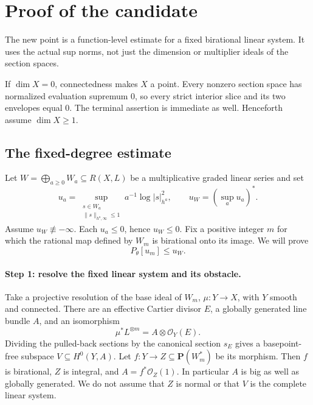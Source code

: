 \section{Proof of the candidate}
\label{sec:p147-candidate-proof}

The new point is a function-level estimate for a fixed birational linear
system.  It uses the actual sup norms, not just the dimension or
multiplier ideals of the section spaces.

If \(\dim X=0\), connectedness makes \(X\) a point.  Every nonzero
section space has normalized evaluation supremum \(0\), so every strict
interior slice and its two envelopes equal \(0\).  The terminal assertion
is immediate as well.  Henceforth assume \(\dim X\geq1\).

\subsection{The fixed-degree estimate}

Let \(W=\bigoplus_{a\geq0}W_a\subseteq R(X,L)\) be a multiplicative graded
linear series and set
\[
 u_a=\sup_{\substack{s\in W_a\\\|s\|_{h^a,\infty}\leq1}}
                   a^{-1}\log|s|_{h^a}^2,\qquad
 u_W=(\sup_a u_a)^*.
\]
Assume \(u_W\not\equiv-\infty\).  Each \(u_a\leq0\), hence \(u_W\leq0\).
Fix a positive integer \(m\) for which the rational map defined by \(W_m\)
is birational onto its image.  We will prove
\begin{equation}\label{eq:p147-fixed-degree-bound}
                         P_\theta[u_m]\leq u_W.
\end{equation}

\paragraph{Step 1: resolve the fixed linear system and its obstacle.}
Take a projective resolution of the base ideal of \(W_m\),
\(\mu:Y\to X\), with \(Y\) smooth and connected.  There are an effective
Cartier divisor \(E\), a globally generated line bundle \(A\), and an
isomorphism
\begin{equation}\label{eq:p147-resolved-bundle}
             \mu^*L^{\otimes m}=A\otimes\mathcal O_Y(E).
\end{equation}
Dividing the pulled-back sections by the canonical section \(s_E\)
gives a basepoint-free subspace \(V\subseteq H^0(Y,A)\).
Let \(f:Y\to Z\subseteq\mathbf P(W_m^*)\) be its morphism.
Then \(f\) is birational, \(Z\) is integral, and
\(A=f^*\mathcal O_Z(1)\).  In particular \(A\) is big as well as globally
generated.  We do not assume that \(Z\) is normal or that \(V\) is the
complete linear system.

